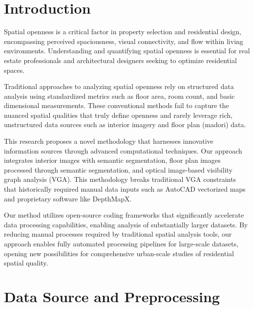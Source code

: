 \documentclass[11pt,a4paper]{article}
\begin{document}
\begin{multicols}{2}
\fontsize{11}{13}\selectfont

\section{Introduction}

Spatial openness is a critical factor in property selection and residential design, encompassing
perceived spaciousness, visual connectivity, and flow within living environments. Understanding
and quantifying spatial openness is essential for real estate professionals and architectural
designers seeking to optimize residential spaces.

Traditional approaches to analyzing spatial openness rely on structured data analysis using
standardized metrics such as floor area, room count, and basic dimensional measurements. These
conventional methods fail to capture the nuanced spatial qualities that truly define openness
and rarely leverage rich, unstructured data sources such as interior imagery and floor plan
(madori) data.

This research proposes a novel methodology that harnesses innovative information sources through
advanced computational techniques. Our approach integrates interior images with semantic
segmentation, floor plan images processed through semantic segmentation, and optical image-based
visibility graph analysis (VGA). This methodology breaks traditional VGA constraints that
historically required manual data inputs such as AutoCAD vectorized maps and proprietary
software like DepthMapX.

Our method utilizes open-source coding frameworks that significantly accelerate data processing
capabilities, enabling analysis of substantially larger datasets. By reducing manual processes
required by traditional spatial analysis tools, our approach enables fully automated processing
pipelines for large-scale datasets, opening new possibilities for comprehensive urban-scale
studies of residential spatial quality.

\section{Data Source and Preprocessing}


\end{multicols}
\end{document}
